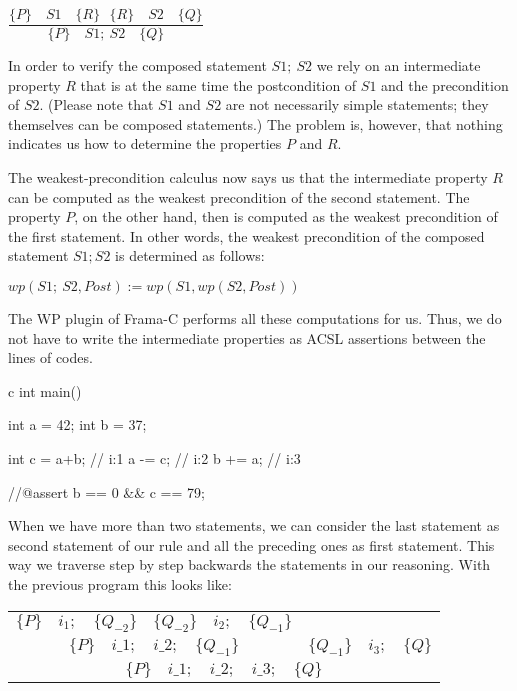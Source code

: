 \documentclass[middle]{zmdocument}
\begin{document}
\begin{center}
$\dfrac{\{P\}\quad S1 \quad \{R\} \ \ \ \{R\}\quad S2 \quad \{Q\}}{\{P\}\quad S1 ;\ S2 \quad \{Q\}}$


\end{center}


In order to verify the composed statement $S1;\ S2$ we rely on an
intermediate property $R$ that is at the same time the postcondition
of $S1$ and the precondition of $S2$. (Please note that $S1$ and
$S2$ are not necessarily simple statements; they themselves can be
composed statements.) The problem is, however, that nothing indicates us
how to determine the properties $P$ and $R$.

The weakest-precondition calculus now says us that the intermediate
property $R$ can be computed as the weakest precondition of the second
statement. The property $P$, on the other hand, then is computed as
the weakest precondition of the first statement. In other words, the
weakest precondition of the composed statement $S1; S2$ is determined
as follows:



\begin{center}
$wp(S1;\ S2 , Post) := wp(S1, wp(S2, Post) )$


\end{center}


The WP plugin of Frama-C performs all these computations for us. Thus,
we do not have to write the intermediate properties as ACSL assertions
between the lines of codes.



\begin{CodeBlock}{c}
int main(){
  int a = 42;
  int b = 37;

  int c = a+b; // i:1
  a -= c;      // i:2
  b += a;      // i:3

  //@assert b == 0 && c == 79;
}
\end{CodeBlock}





When we have more than two statements, we can consider the last
statement as second statement of our rule and all the preceding ones as
first statement. This way we traverse step by step backwards the
statements in our reasoning. With the previous program this looks like:


\begin{center}
\begin{tabular}{ccc}
  $\{P\}\quad i_1 ; \quad \{Q_{-2}\}$ & $\{Q_{-2}\}\quad i_2 ; \quad \{Q_{-1}\}$ & \\
  \cline{1-2}
  \multicolumn{2}{c}{$\{P\}\quad i\_1 ; \quad i\_2 ; \quad \{Q_{-1}\}$} & $\{Q_{-1}\} \quad i_3 ; \quad \{Q\}$\\
  \hline
  \multicolumn{3}{c}{$\{P\}\quad i\_1 ; \quad i\_2 ; \quad i\_3; \quad \{ Q \}$}
\end{tabular}
\end{center}
\end{document}
